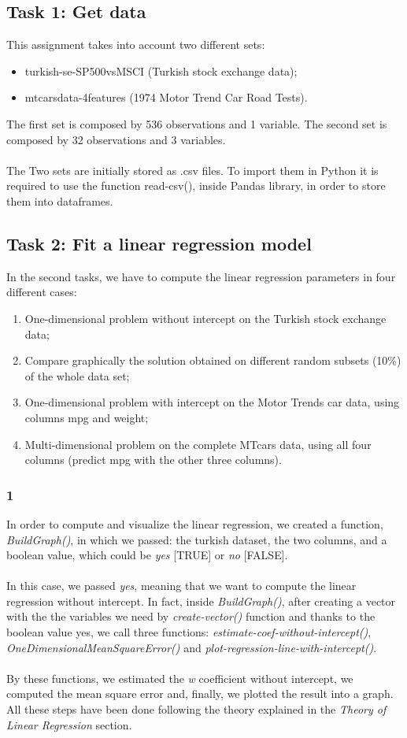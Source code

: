 \documentclass[10pt]{article}
\begin{document}
\subsection{Task 1: Get data}
This assignment takes into account two different sets:
\begin{itemize}
 \item turkish-se-SP500vsMSCI (Turkish stock exchange data);
 \item mtcarsdata-4features (1974 Motor Trend Car Road Tests).
 \end{itemize}
 The first set is composed by 536 observations and 1 variable. The second set is composed by 32 observations and 3
variables.\\\\The Two sets are initially stored as .csv files. To import
them in Python it is required to use the function read-csv(), inside Pandas library, in order to store them into dataframes.

\subsection{Task 2: Fit a linear regression model}
In the second tasks, we have to compute the linear regression parameters in four different cases:
\begin{enumerate}
    \item One-dimensional problem without intercept on the Turkish stock exchange data;
    \item Compare graphically the solution obtained on different random subsets (10\%) of the whole data set;
    \item One-dimensional problem with intercept on the Motor Trends car data, using columns mpg and weight;
    \item Multi-dimensional problem on the complete MTcars data, using all four columns (predict mpg with the other three columns).
\end{enumerate}
\subsubsection{1}
In order to compute and visualize the linear regression, we created a function, \textit{BuildGraph()}, in which we passed: the turkish dataset, the two columns, and a boolean value, which could be \textit{yes} [TRUE] or \textit{no} [FALSE].\\\\
In this case, we passed \textit{yes}, meaning that we want to compute the linear regression without intercept. In fact, inside \textit{BuildGraph()}, after creating a vector with the the variables we need by \textit{create-vector()} function and thanks to the boolean value yes, we call three functions: \textit{estimate-coef-without-intercept()}, \textit{OneDimensionalMeanSquareError()} and \textit{plot-regression-line-with-intercept()}.
\\\\
By these functions, we estimated the \textit{w} coefficient without intercept, we computed the mean square error and, finally, we plotted the result into a graph. All these steps have been done following the theory explained in the \textit{Theory of Linear Regression} section.
\end{document}
